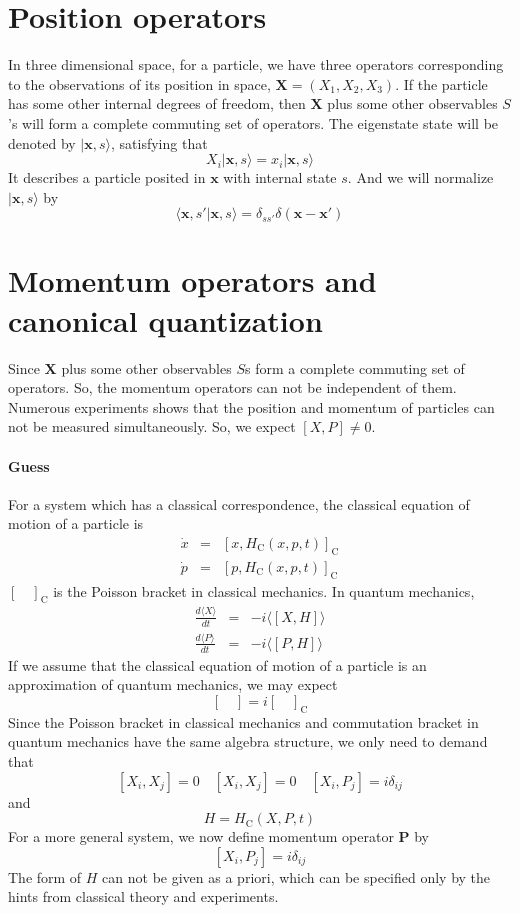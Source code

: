 \section{Position operators}
\noindent
In three dimensional space, for a particle, we have three operators corresponding to the observations of its position in space, $\bm{X} = (X_1, X_2, X_3)$. If the particle has some other internal degrees of freedom, then $\bm{X}$ plus some other observables $S$'s will form  a complete commuting set of operators. The eigenstate state will be denoted by $| \bm{x},s \rangle$, satisfying that
\[X_i | \bm{x},s \rangle = x_i | \bm{x},s \rangle  \]
It describes a particle posited in $\bm{x}$ with internal state $s$. And we will normalize $| \bm{x},s \rangle $ by 
\[\langle \bm{x},s'| \bm{x},s \rangle = \delta_{ss'}\delta(\bm{x}-\bm{x}')\]

\section{Momentum operators and canonical quantization}
\noindent
Since $\bm{X}$ plus some other observables $S$s form a complete commuting set of operators. So, the momentum operators can not be independent of them. Numerous experiments shows that the position and momentum of particles can not be measured simultaneously. So, we expect $[X,P] \neq 0$.
\paragraph{Guess} 
For a system which has a classical correspondence, the classical equation of motion of a particle is
\begin{eqnarray}
\dot{x} &=& [x,H_{\mathrm{C}}(x,p,t)]_{\mathrm{C}} \nonumber \\
\dot{p} &=& [p,H_{\mathrm{C}}(x,p,t)]_{\mathrm{C}} \nonumber
\end{eqnarray}
$[\quad]_{\mathrm{C}}$ is the Poisson bracket in classical mechanics. In quantum mechanics,
\begin{eqnarray}
\frac{d\langle X \rangle}{dt} &=& -i \langle [X,H] \rangle \nonumber \\
\frac{d\langle P \rangle}{dt} &=& -i \langle [P,H] \rangle \nonumber
\end{eqnarray}
If we assume that the classical equation of motion of a particle is an approximation of quantum mechanics, we may expect
\[[\quad] = i [\quad]_{\mathrm{C}} \]
Since the Poisson bracket in classical mechanics and commutation bracket in quantum mechanics have the same algebra structure, we only need to demand that
\[[X_i,X_j] = 0 \quad [X_i,X_j] = 0 \quad [X_i,P_j] = i \delta_{ij}\]
and
\[H = H_{\mathrm{C}}(X,P,t)\]
For a more general system, we now define momentum operator $\bm{P}$ by 
\[[X_i,P_j] = i \delta_{ij}\]
The form of $H$ can not be given as a priori, which can be specified only by the hints from classical theory and experiments.

